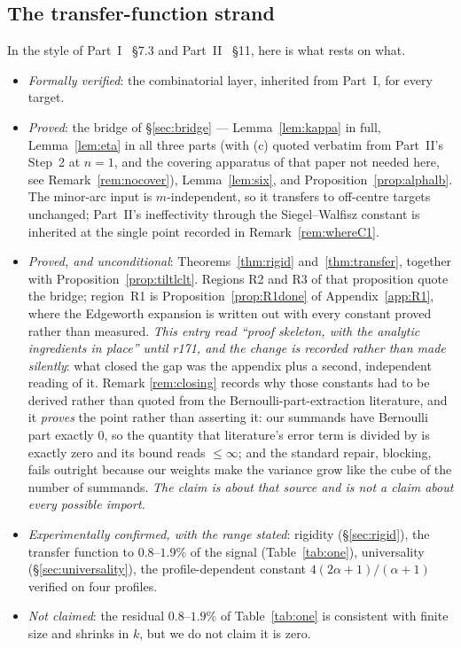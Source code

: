 \documentclass[11pt,a4paper]{article}
\theoremstyle{plain}
\theoremstyle{definition}
\theoremstyle{remark}
\newcommand{\Xref}[3]{#3}
\begin{document}
\subsection{The transfer-function strand}\label{sec:scope3}

In the style of Part~I~\cite{P1} \S\Xref{paper}{sec:achieved}{7.3} and
Part~II~\cite{P2} \S\Xref{paper2}{sec:remains}{11}, here is what rests on what.

\begin{itemize}
\item \emph{Formally verified}: the combinatorial layer, inherited from Part~I, for every
      target.
\item \emph{Proved}: the bridge of \S\ref{sec:bridge} --- Lemma~\ref{lem:kappa} in full,
      Lemma~\ref{lem:eta} in all three parts (with (c) quoted verbatim from Part~II's Step~2
      at $n=1$, and the covering apparatus of that paper not needed here, see
      Remark~\ref{rem:nocover}), Lemma~\ref{lem:six}, and Proposition~\ref{prop:alphalb}.
      The minor-arc input is $m$-independent, so it transfers to off-centre targets unchanged;
      Part~II's ineffectivity through the Siegel--Walfisz constant is inherited at the single
      point recorded in Remark~\ref{rem:whereC1}.
\item \emph{Proved, and unconditional}: Theorems~\ref{thm:rigid} and~\ref{thm:transfer},
      together with Proposition~\ref{prop:tiltlclt}. Regions R2 and R3 of that proposition
      quote the bridge; region~R1 is Proposition~\ref{prop:R1done} of Appendix~\ref{app:R1},
      where the Edgeworth expansion is written out with every constant proved rather than
      measured. \emph{This entry read ``proof skeleton, with the analytic ingredients in
      place'' until r171, and the change is recorded rather than made silently}: what closed
      the gap was the appendix plus a second, independent reading of it. Remark
      \ref{rem:closing} records why those constants had to be derived rather than quoted from
      the Bernoulli-part-extraction literature, and it \emph{proves} the point rather than
      asserting it: our summands have Bernoulli part exactly $0$, so the quantity that
      literature's error term is divided by is exactly zero and its bound reads $\le\infty$;
      and the standard repair, blocking, fails outright because our weights make the variance
      grow like the cube of the number of summands. \emph{The claim is about that source and
      is not a claim about every possible import.}
\item \emph{Experimentally confirmed, with the range stated}: rigidity
      (\S\ref{sec:rigid}), the transfer function to $0.8$--$1.9\%$ of the signal
      (Table~\ref{tab:one}), universality (\S\ref{sec:universality}), the profile-dependent
      constant $4(2\alpha+1)/(\alpha+1)$ verified on four profiles.
\item \emph{Not claimed}: the residual $0.8$--$1.9\%$ of Table~\ref{tab:one} is consistent
      with finite size and shrinks in $k$, but we do not claim it is zero.
\end{itemize}
\end{document}
